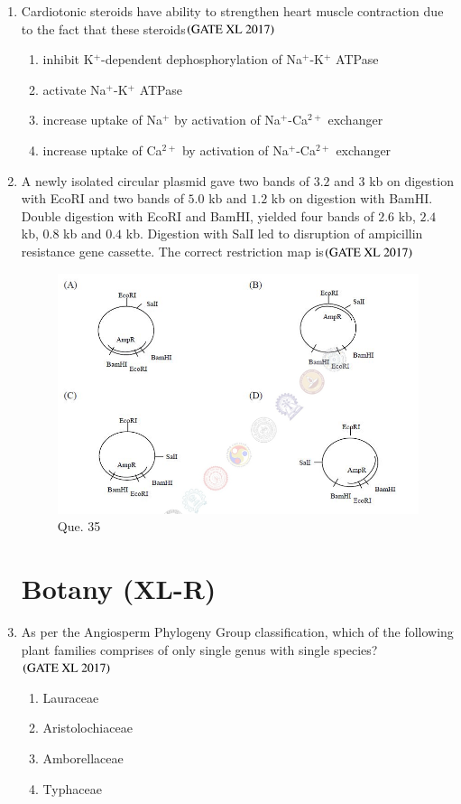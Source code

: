 \documentclass[journal]{IEEEtran}
\begin{document}
\begin{enumerate}
\item Cardiotonic steroids have ability to strengthen heart muscle contraction due to the fact that these steroids\hfill $\left(\text{GATE XL 2017}\right)$
\begin{enumerate}
\item inhibit K$^{+}$-dependent dephosphorylation of Na$^{+}$-K$^{+}$ ATPase
\item activate Na$^{+}$-K$^{+}$ ATPase
\item increase uptake of Na$^{+}$ by activation of Na$^{+}$-Ca$^{2+}$ exchanger
\item increase uptake of Ca$^{2+}$ by activation of Na$^{+}$-Ca$^{2+}$ exchanger
\end{enumerate}

\item A newly isolated circular plasmid gave two bands of $3.2$ and $3$ kb on digestion with EcoRI and two bands of $5.0$ kb and $1.2$ kb on digestion with BamHI. Double digestion with EcoRI and BamHI, yielded four bands of $2.6$ kb, $2.4$ kb, $0.8$ kb and $0.4$ kb. Digestion with SalI led to disruption of ampicillin resistance gene cassette. The correct restriction map is\hfill $\left(\text{GATE XL 2017}\right)$
\begin{figure}[H]
    \centering
    \includegraphics[width=0.9\columnwidth]{figs/q35_combined.png}
    \caption{Que. 35}
    \label{fig:placeholder}
\end{figure}

\section*{Botany (XL-R)}
\setcounter{enumi}{35}

\item As per the Angiosperm Phylogeny Group  classification, which of the following plant families comprises of only single genus with single species?\hfill $\left(\text{GATE XL 2017}\right)$
\begin{multicols}{2}
\begin{enumerate}
\item Lauraceae
\item Aristolochiaceae
\item Amborellaceae
\item Typhaceae
\end{enumerate}
\end{multicols}


\end{enumerate}
\end{document}
